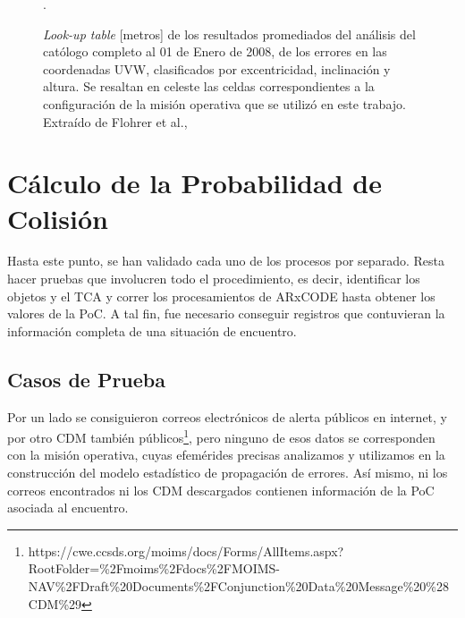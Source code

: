 \begin{figure}[!h]
  \centering
  \caption{{\it{Look-up table}} [metros] de los resultados promediados del an\'alisis del cat\'ologo completo al 01 de Enero de 2008, de los errores en las coordenadas UVW, clasificados por excentricidad, inclinaci\'on y altura. Se resaltan en celeste las celdas correspondientes a la configuraci\'on de la misi\'on operativa que se utiliz\'o en este trabajo. Extra\'ido de Flohrer et al., \citep{flohrer2008assessment}}.
  \label{fig:flohrer}
\end{figure}

% 

\section{C\'alculo de la Probabilidad de Colisi\'on}

Hasta este punto, se han validado cada uno de los procesos por separado.
Resta hacer pruebas que involucren todo el procedimiento, es decir, identificar los objetos y el TCA y correr los procesamientos de ARxCODE hasta obtener los valores de la PoC.
A tal fin, fue necesario conseguir registros que contuvieran la informaci\'on completa de una situaci\'on de encuentro.\\

\subsection*{Casos de Prueba}
Por un lado se consiguieron correos electr\'onicos de alerta p\'ublicos en internet, y por otro CDM tambi\'en p\'ublicos\footnote{https://cwe.ccsds.org/moims/docs/Forms/AllItems.aspx?RootFolder=\%2Fmoims\%2Fdocs\%2FMOIMS-NAV\%2FDraft\%20Documents\%2FConjunction\%20Data\%20Message\%20\%28CDM\%29}, pero ninguno de esos datos se corresponden con la misi\'on operativa, cuyas efem\'erides precisas analizamos y utilizamos en la construcci\'on del modelo estad\'istico de propagaci\'on de errores.
As\'i mismo, ni los correos encontrados ni los CDM descargados contienen informaci\'on de la PoC asociada al encuentro. 

